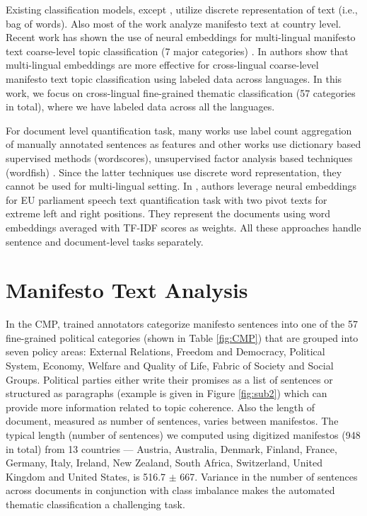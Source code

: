 \documentclass[11pt,a4paper]{article}
\begin{document}
Existing classification models, except \cite{W17-2906}, utilize discrete representation of text (i.e., bag of words).  Also most of the work analyze manifesto text at country level. Recent work has shown the use of neural embeddings for multi-lingual manifesto text coarse-level topic classification (7 major categories) \cite{W17-2906}. In \cite{W17-2906} authors show that multi-lingual embeddings are more effective for cross-lingual coarse-level manifesto text topic classification using labeled data across languages. In this work, we focus on cross-lingual fine-grained thematic classification (57 categories in total), where we have labeled data across all the languages.

For document level quantification task, many works use label count aggregation of  manually annotated sentences as features \cite{lowe2011scaling, benoit2014putting} and other works use dictionary based supervised methods (wordscores), unsupervised factor analysis based techniques (wordfish) \cite{hjorth2015computers, 2017arXiv170704737B}. Since the latter techniques use discrete word representation, they cannot be used for multi-lingual setting. In \cite{EACL}, authors leverage neural embeddings for EU parliament speech text quantification task with two pivot texts for extreme left and right positions. They represent the documents using word embeddings averaged with TF-IDF scores as weights. All these approaches handle sentence and document-level tasks separately.


\section{Manifesto Text Analysis}

In the CMP, trained annotators categorize manifesto sentences into one of the 57 fine-grained political categories (shown in Table \ref{fig:CMP}) that are grouped into seven policy areas: External Relations, Freedom and Democracy, Political System, Economy, Welfare and Quality of Life, Fabric of Society and Social Groups. Political parties either write their promises as a list of sentences or structured as paragraphs (example is given in Figure \ref{fig:sub2}) which can provide more information related to topic coherence. Also the length of document, measured as number of sentences, varies between manifestos. The typical length (number of sentences) we computed using digitized manifestos (948 in total) from 13 countries --- Austria, Australia, Denmark, Finland, France, Germany, Italy, Ireland, New Zealand, South Africa, Switzerland, United Kingdom and United States, is 516.7 $\pm$ 667. Variance in the number of sentences across documents in conjunction with class imbalance makes the automated thematic classification a challenging task.  
\end{document}

